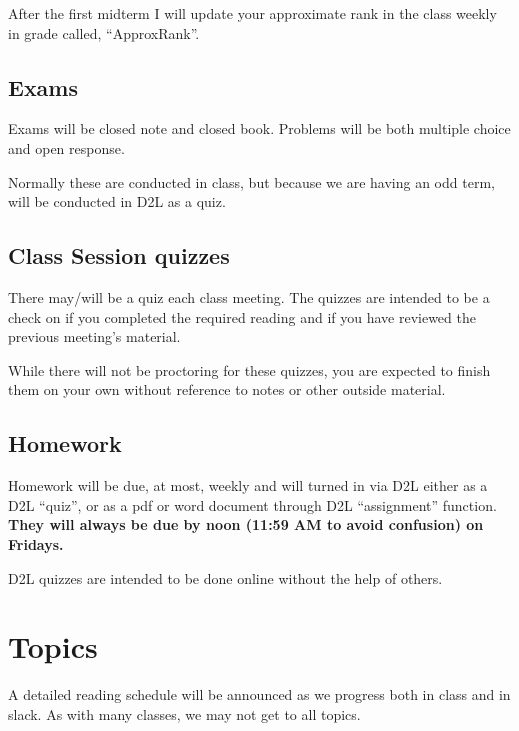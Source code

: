 \documentclass[
]{article}
\begin{document}
After the first midterm I will update your approximate rank in the class
weekly in grade called, ``ApproxRank''.

\hypertarget{exams}{%
\subsection{Exams}\label{exams}}

Exams will be closed note and closed book. Problems will be both
multiple choice and open response.

Normally these are conducted in class, but because we are having an odd
term, will be conducted in D2L as a quiz.

\hypertarget{class-session-quizzes}{%
\subsection{Class Session quizzes}\label{class-session-quizzes}}

There may/will be a quiz each class meeting. The quizzes are intended to
be a check on if you completed the required reading and if you have
reviewed the previous meeting's material.

While there will not be proctoring for these quizzes, you are expected
to finish them on your own without reference to notes or other outside
material.

\hypertarget{homework}{%
\subsection{Homework}\label{homework}}

Homework will be due, at most, weekly and will turned in via D2L either
as a D2L ``quiz'', or as a pdf or word document through D2L
``assignment'' function. \textbf{They will always be due by noon (11:59
AM to avoid confusion) on Fridays.}

D2L quizzes are intended to be done online without the help of others.

\hypertarget{topics}{%
\section{Topics}\label{topics}}

A detailed reading schedule will be announced as we progress both in
class and in slack. As with many classes, we may not get to all topics.
\end{document}
